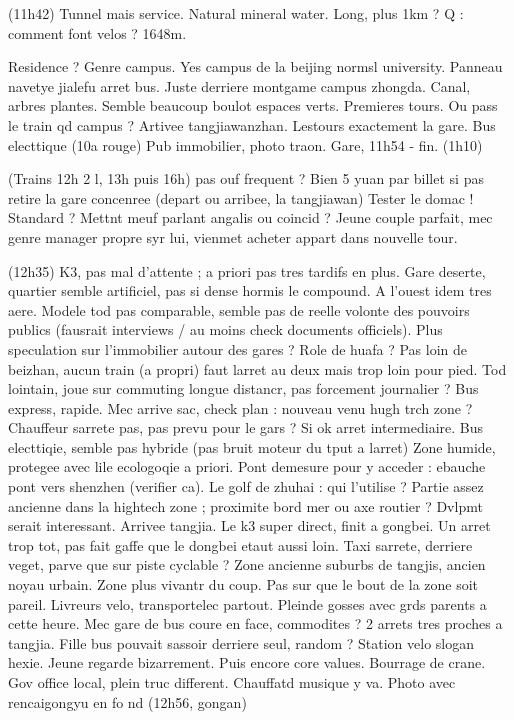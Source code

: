 (11h42)
Tunnel mais service. Natural mineral water.
Long, plus 1km ? Q : comment font velos ? 1648m.

Residence ? Genre campus.
Yes campus de la beijing normsl university.
Panneau navetye jialefu arret bus.
Juste derriere montgame campus zhongda.
Canal, arbres plantes. Semble beaucoup boulot espaces verts.
Premieres tours. Ou pass le train qd campus ?
Artivee tangjiawanzhan. Lestours exactement la gare.
Bus electtique (10a rouge)
Pub immobilier, photo traon.
Gare, 11h54 - fin. (1h10)

(Trains 12h 2 l, 13h puis 16h) pas ouf frequent ?
Bien 5 yuan par billet si pas retire la gare concenree (depart ou arribee, la tangjiawan)
Tester le domac ! Standard ? Mettnt meuf parlant angalis ou coincid ?
Jeune couple parfait, mec genre manager propre syr lui, vienmet acheter appart dans nouvelle tour.


(12h35)
K3, pas mal d'attente ; a priori pas tres tardifs en plus.
Gare deserte, quartier semble artificiel, pas si dense hormis le compound. A l'ouest idem tres aere.
Modele tod pas comparable, semble pas de reelle volonte des pouvoirs publics (fausrait interviews / au moins check documents officiels). Plus speculation sur l'immobilier autour des gares ? Role de huafa ? Pas loin de beizhan, aucun train (a propri) faut larret au deux mais trop loin pour pied. Tod lointain, joue sur commuting longue distancr, pas forcement journalier ? Bus express, rapide.
Mec arrive sac, check plan : nouveau venu hugh trch zone ? Chauffeur sarrete pas, pas prevu pour le gars ? Si ok arret intermediaire.
Bus electtiqie, semble pas hybride (pas bruit moteur du tput a larret)
Zone humide, protegee avec lile ecologoqie a priori. Pont demesure pour y acceder : ebauche pont vers shenzhen (verifier ca).
Le golf de zhuhai : qui l'utilise ?
Partie assez ancienne dans la hightech zone ; proximite bord mer ou axe routier ? Dvlpmt serait interessant.
Arrivee tangjia. Le k3 super direct, finit a gongbei. Un arret trop tot, pas fait gaffe que le dongbei etaut aussi loin. Taxi sarrete, derriere veget, parve que sur piste cyclable ?
Zone ancienne suburbs de tangjis, ancien noyau urbain. Zone plus vivantr du coup. Pas sur que le bout de la zone soit pareil.
Livreurs velo, transportelec partout. Pleinde gosses avec grds parents a cette heure. Mec gare de bus coure en face, commodites ?
2 arrets tres proches a tangjia. Fille bus pouvait sassoir derriere seul, random ?
Station velo slogan hexie. Jeune regarde bizarrement. Puis encore core values. Bourrage de crane. Gov office local, plein truc different. Chauffatd musique y va. Photo avec rencaigongyu en fo nd
(12h56, gongan)




